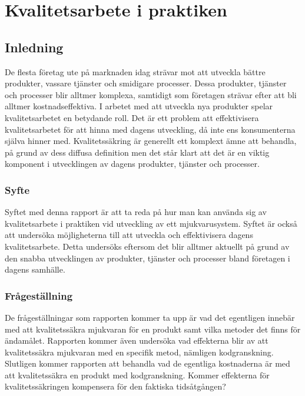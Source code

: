 \chapter{Kvalitetsarbete i praktiken}
\label{cha:indiv-report-person}

\section{Inledning}
\label{sec:introduction-person}

De flesta företag ute på marknaden idag strävar mot att utveckla bättre produkter, vassare tjänster och smidigare processer. Dessa produkter, tjänster och processer blir alltmer komplexa, samtidigt som företagen strävar efter att bli alltmer kostnadseffektiva. I arbetet med att utveckla nya produkter spelar kvalitetsarbetet en betydande roll. Det är ett problem att effektivisera kvalitetsarbetet för att hinna med dagens utveckling, då inte ens konsumenterna själva hinner med. Kvalitetssäkring är generellt ett komplext ämne att behandla, på grund av dess diffusa definition men det står klart att det är en viktig komponent i utvecklingen av dagens produkter, tjänster och processer.

\subsection{Syfte}
\label{sec:purpose-person}

Syftet med denna rapport är att ta reda på hur man kan använda sig av kvalitetsarbete i praktiken vid utveckling av ett mjukvarusystem. Syftet är också att undersöka möjligheterna till att utveckla och effektivisera dagens kvalitetsarbete. Detta undersöks eftersom det blir alltmer aktuellt på grund av den snabba utvecklingen av produkter, tjänster och processer bland företagen i dagens samhälle.


\subsection{Frågeställning}
\label{sec:issue-person}

De frågeställningar som rapporten kommer ta upp är vad det egentligen innebär med att kvalitetssäkra mjukvaran för en produkt samt vilka metoder det finns för ändamålet.  Rapporten kommer även undersöka vad effekterna blir av att kvalitetssäkra mjukvaran med en specifik metod, nämligen kodgranskning. Slutligen kommer rapporten att behandla vad de egentliga kostnaderna är med att kvalitetssäkra en produkt med kodgranskning. Kommer effekterna för kvalitetssäkringen kompensera för den faktiska tidsåtgången?

